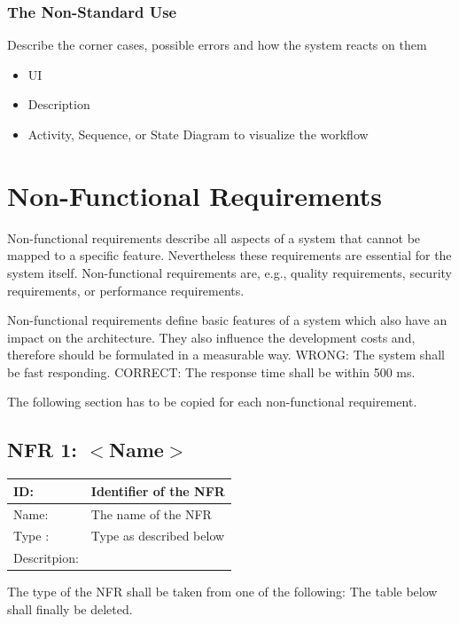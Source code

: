 \documentclass[12pt]{article}
\theoremstyle{definition}
\newenvironment{explanation}{%
   \setlength{\parindent}{0pt}
   \itshape
   \color{blue}
}{}
\begin{document}
\subsubsection{The Non-Standard Use}
\begin{explanation}
Describe the corner cases, possible errors and how the system reacts on them
\begin{itemize}
	\item UI
	\item Description
	\item Activity, Sequence, or State Diagram to visualize the workflow
\end{itemize}
\end{explanation}
\pagebreak

\section{Non-Functional Requirements}
\begin{explanation}
Non-functional requirements describe all aspects of a system that cannot be mapped to a specific feature. Nevertheless these requirements are essential for the system itself. Non-functional requirements are, e.g., quality requirements, security requirements, or performance requirements.

Non-functional requirements define basic features of a system which also have an impact on the architecture. They also influence the development costs and, therefore should be formulated in a measurable way.
WRONG: The system shall be fast responding.
CORRECT: The response time shall be within 500 ms.

The following section has to be copied for each non-functional requirement.
\end{explanation}

\subsection{NFR 1: $<$Name$>$}
\begin{tabular}{|p{.2\linewidth}|p{.65\linewidth}|}
\hline 
ID: & Identifier of the NFR \\ \hline
Name: & The name of the NFR \\ \hline
Type	: & Type as described below \\ \hline
Descritpion: &  \\ \hline
\end{tabular}

The type of the NFR shall be taken from one of the following: The table below shall finally be deleted.
\end{document}
